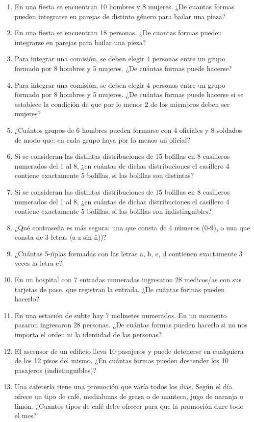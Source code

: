 \documentclass[a4paper]{article}
\begin{document}
\begin{enumerate}
\begin{enumerate} [label=(\alph*)]
		\item En una fiesta se encuentran 10 hombres y 8 mujeres. ¿De cuantas formas pueden integrarse en parejas de distinto género para bailar una pieza?
		\item En una fiesta se encuentran 18 personas. ¿De cuantas formas pueden integrarse en parejas para bailar una pieza?
		\item Para integrar una comisión, se deben elegir 4 personas entre un grupo formado por 8 hombres y 5 mujeres. ¿De cuántas formas puede hacerse?
		\item Para integrar una comisión, se deben elegir 4 personas entre un grupo formado por 8 hombres y 5 mujeres. ¿De cuántas formas puede hacerse si se establece la condición de que por lo menos 2 de los miembros deben ser mujeres?
		\item ¿Cuántos grupos de 6 hombres pueden formarse con 4 oficiales y 8 soldados de modo que: en cada grupo haya por lo menos un oficial?
		\item Si se consideran las distintas distribuciones de 15 bolillas en 8 casilleros numerados del 1 al 8, ¿en cuántas de dichas distribuciones el casillero 4 contiene exactamente 5 bolillas, si las bolillas son distintas?
		\item Si se consideran las distintas distribuciones de 15 bolillas en 8 casilleros numerados del 1 al 8, ¿en cuántas de dichas distribuciones el casillero 4 contiene exactamente 5 bolillas, si las bolillas son indistinguibles?
		\item ¿Qué contraseña es más segura: una que consta de 4 números (0-9), o una que consta de 3 letras (a-z sin ñ))?
		\item ¿Cuántas 5-úplas formadas con las letras a, b, c, d contienen exactamente 3 veces	la letra c?
		\item En un hospital con 7 entradas numeradas ingresaron 28 medicos/as con sus tarjetas de pase, que registran la entrada. ¿De cuántas formas pueden hacerlo? 
		\item En una estación de subte hay 7 molinetes numerados. En un momento pasaron ingresaron 28 personas. ¿De cuántas formas pueden hacerlo si no nos importa el orden ni la identidad de las personas?
		\item El ascensor de un edificio lleva 10 pasajeros y puede detenerse en cualquiera de los 12 pisos del mismo. ¿En cuántas formas pueden descender los 10 pasajeros (indistinguibles)?
		\item Una cafetería tiene una promoción que varía todos los dias. Según el día ofrece un tipo de café, medialunas de grasa o de manteca, jugo de naranja o limón. ¿Cuantos tipos de café debe ofrecer para que la promoción dure todo el mes?

\end{enumerate}
\end{enumerate}
\end{document}
